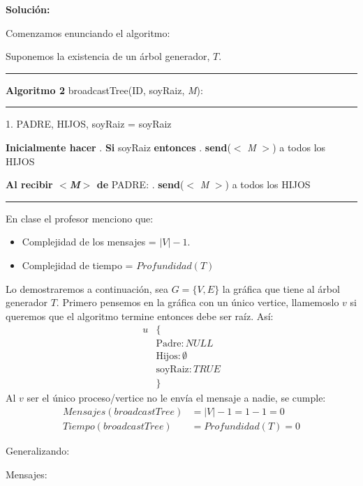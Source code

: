 \documentclass[8pt, letterpaper]{article}
\begin{document}
\begin{enumerate}
\begin{itemize}
    \hfill\break
    \ttfamily
    {\bf Solución:}

    Comenzamos enunciando el algoritmo:

    Suponemos la existencia de un árbol generador, $T$.

    \rule{1\textwidth}{0.2mm}
    {\bf Algoritmo 2} broadcastTree(ID, soyRaiz, {\it M}):
    \hfill\break
    \rule{1\textwidth}{0.2mm}
    1. PADRE, HIJOS, soyRaiz = soyRaiz
    
    \hfill\break
    \hspace*{.2cm} {\bf Inicialmente hacer}
    \hfill{}. {\bf Si} soyRaiz {\bf entonces}
    \hfill{}. \hspace{0.5cm} {\bf send}($<$ \textit{M} $>$) a todos los HIJOS
    \hfill\break
    
    \hspace{0.2cm} {\bf Al recibir $<${\it M}$>$ de} PADRE:
    \hfill{}. \hspace{0.5cm} {\bf send}($<$ \textit{M} $>$) a todos los HIJOS
  \hfill\break
  \rule{1\textwidth}{0.2mm}
  \hfill\break
  En clase el profesor menciono que:
  \begin{itemize}
  \item Complejidad de los mensajes = $|V|-1$.
  \item Complejidad de tiempo = $Profundidad(T)$
  \end{itemize}
  Lo demostraremos a continuación, sea $G=\{V,E\}$ la gráfica que tiene al
  árbol generador $T$.
  \newpage
  Primero pensemos en la gráfica con un único vertice, llamemoslo $v$ si
  queremos que el algoritmo termine entonces debe ser raíz. Así:
  \begin{align*}
    u &\{\\
    &\text{Padre} : NULL\\
    &\text{Hijos} : \emptyset\\
    &\text{soyRaiz}: TRUE\\
    &\}
  \end{align*}
  Al $v$ ser el único proceso/vertice no le envía el mensaje a nadie, se cumple:
  \begin{align*}
    Mensajes(broadcastTree) &= |V|-1 = 1-1 = 0\\
    Tiempo(broadcastTree) &= Profundidad(T) = 0
  \end{align*}

  \hfill\break
  Generalizando:

  Mensajes:
  

\end{itemize}
\end{enumerate}
\end{document}
